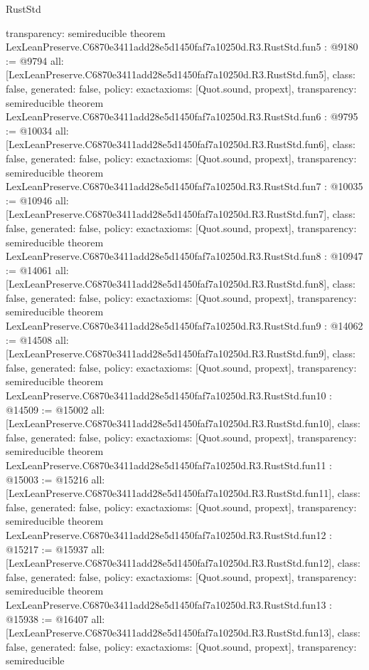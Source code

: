 \begin{lexlean}{RustStd}
\begin{coremodule}
{  transparency: semireducible
}
theorem LexLeanPreserve.C6870e3411add28e5d1450faf7a10250d.R3.RustStd.fun5 : @9180 := @9794 {
  all: [LexLeanPreserve.C6870e3411add28e5d1450faf7a10250d.R3.RustStd.fun5],
  class: false,
  generated: false,
  policy: exact{axioms: [Quot.sound, propext]},
  transparency: semireducible
}
theorem LexLeanPreserve.C6870e3411add28e5d1450faf7a10250d.R3.RustStd.fun6 : @9795 := @10034 {
  all: [LexLeanPreserve.C6870e3411add28e5d1450faf7a10250d.R3.RustStd.fun6],
  class: false,
  generated: false,
  policy: exact{axioms: [Quot.sound, propext]},
  transparency: semireducible
}
theorem LexLeanPreserve.C6870e3411add28e5d1450faf7a10250d.R3.RustStd.fun7 : @10035 := @10946 {
  all: [LexLeanPreserve.C6870e3411add28e5d1450faf7a10250d.R3.RustStd.fun7],
  class: false,
  generated: false,
  policy: exact{axioms: [Quot.sound, propext]},
  transparency: semireducible
}
theorem LexLeanPreserve.C6870e3411add28e5d1450faf7a10250d.R3.RustStd.fun8 : @10947 := @14061 {
  all: [LexLeanPreserve.C6870e3411add28e5d1450faf7a10250d.R3.RustStd.fun8],
  class: false,
  generated: false,
  policy: exact{axioms: [Quot.sound, propext]},
  transparency: semireducible
}
theorem LexLeanPreserve.C6870e3411add28e5d1450faf7a10250d.R3.RustStd.fun9 : @14062 := @14508 {
  all: [LexLeanPreserve.C6870e3411add28e5d1450faf7a10250d.R3.RustStd.fun9],
  class: false,
  generated: false,
  policy: exact{axioms: [Quot.sound, propext]},
  transparency: semireducible
}
theorem LexLeanPreserve.C6870e3411add28e5d1450faf7a10250d.R3.RustStd.fun10 : @14509 := @15002 {
  all: [LexLeanPreserve.C6870e3411add28e5d1450faf7a10250d.R3.RustStd.fun10],
  class: false,
  generated: false,
  policy: exact{axioms: [Quot.sound, propext]},
  transparency: semireducible
}
theorem LexLeanPreserve.C6870e3411add28e5d1450faf7a10250d.R3.RustStd.fun11 : @15003 := @15216 {
  all: [LexLeanPreserve.C6870e3411add28e5d1450faf7a10250d.R3.RustStd.fun11],
  class: false,
  generated: false,
  policy: exact{axioms: [Quot.sound, propext]},
  transparency: semireducible
}
theorem LexLeanPreserve.C6870e3411add28e5d1450faf7a10250d.R3.RustStd.fun12 : @15217 := @15937 {
  all: [LexLeanPreserve.C6870e3411add28e5d1450faf7a10250d.R3.RustStd.fun12],
  class: false,
  generated: false,
  policy: exact{axioms: [Quot.sound, propext]},
  transparency: semireducible
}
theorem LexLeanPreserve.C6870e3411add28e5d1450faf7a10250d.R3.RustStd.fun13 : @15938 := @16407 {
  all: [LexLeanPreserve.C6870e3411add28e5d1450faf7a10250d.R3.RustStd.fun13],
  class: false,
  generated: false,
  policy: exact{axioms: [Quot.sound, propext]},
  transparency: semireducible
}
\end{coremodule}
\end{lexlean}
